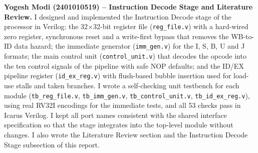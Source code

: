 \noindent\textbf{Yogesh Modi (2401010519) -- Instruction Decode Stage and
Literature Review.}
I designed and implemented the Instruction Decode stage of the processor in
Verilog: the 32$\times$32-bit register file (\texttt{reg\_file.v}) with a
hard-wired zero register, synchronous reset and a write-first bypass that
removes the WB-to-ID data hazard; the immediate generator
(\texttt{imm\_gen.v}) for the I, S, B, U and J formats; the main control unit
(\texttt{control\_unit.v}) that decodes the opcode into the ten control
signals of the pipeline with safe NOP defaults; and the ID/EX pipeline register
(\texttt{id\_ex\_reg.v}) with flush-based bubble insertion used for load-use
stalls and taken branches. I wrote a self-checking unit testbench for each
module (\texttt{tb\_reg\_file.v}, \texttt{tb\_imm\_gen.v},
\texttt{tb\_control\_unit.v}, \texttt{tb\_id\_ex\_reg.v}), using real RV32I
encodings for the immediate tests, and all 53 checks pass in Icarus Verilog.
I kept all port names consistent with the shared interface specification so
that the stage integrates into the top-level module without changes. I also
wrote the Literature Review section and the Instruction Decode Stage
subsection of this report.
